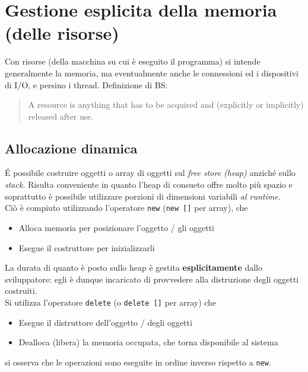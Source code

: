 \documentclass[10pt, oneside]{book}
\begin{document}
\chapter{Gestione esplicita della memoria (delle risorse)}
Con risorse (della macchina su cui è eseguito il programma) si intende generalmente la memoria, ma eventualmente anche le connessioni ed i dispositivi di I/O, e persino i thread. Definizione di BS:
\begin{quote}
A resource is anything that has to be acquired and (explicitly or implicitly) released after use.
\end{quote}

\section{Allocazione dinamica}
\'E possibile costruire oggetti o array di oggetti sul \textit{free store (heap)} anziché sullo \textit{stack}. Risulta conveniente in quanto l'heap di consueto offre molto più spazio e soprattutto è possibile utilizzare porzioni di dimensioni variabili \textit{al runtime}.\\
Ciò è compiuto utilizzando l'operatore \texttt{new} (\texttt{new []} per array), che
\begin{itemize}
\item Alloca memoria per posizionare l'oggetto / gli oggetti
\item Esegue il costruttore per inizializzarli
\end{itemize}
La durata di quanto è posto sullo heap è gestita \textbf{esplicitamente} dallo sviluppatore: egli è dunque incaricato di provvedere alla distruzione degli oggetti costruiti.\\
Si utilizza l'operatore \texttt{delete} (o \texttt{delete []} per array) che
\begin{itemize}
\item Esegue il distruttore dell'oggetto / degli oggetti
\item Dealloca (libera) la memoria occupata, che torna disponibile al sistema
\end{itemize}
si osserva che le operazioni sono eseguite in ordine inverso rispetto a \texttt{new}.
\end{document}

